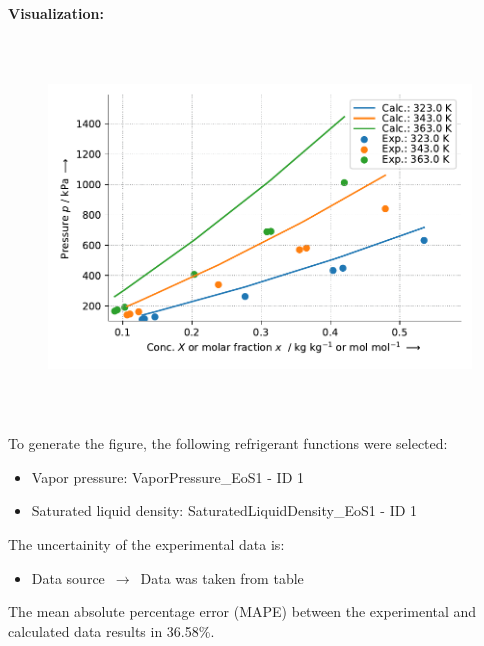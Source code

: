 \textbf{Visualization:}
%
\begin{figure}[!htp]
{\noindent\includegraphics[height=10cm, keepaspectratio]{figs/abs/abs_R-134a_lubricant_PEB6_FloryHuggins_1.pdf}}
\end{figure}
%

To generate the figure, the following refrigerant functions were selected:
\begin{itemize}
\item Vapor pressure: VaporPressure\_EoS1 - ID 1
\item Saturated liquid density: SaturatedLiquidDensity\_EoS1 - ID 1
\end{itemize}

The uncertainity of the experimental data is:
\begin{itemize}
\item Data source $\,\to\,$ Data was taken from table
\end{itemize}

The mean absolute percentage error (MAPE) between the experimental and calculated data results in 36.58\%.
\FloatBarrier
\newpage

